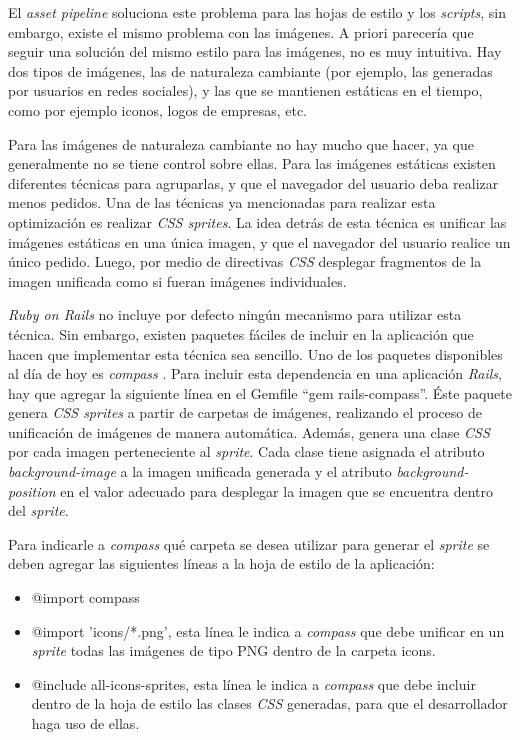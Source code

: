 El \emph{asset pipeline} soluciona este problema para las hojas de estilo y los \emph{scripts}, sin embargo, existe el mismo problema con las imágenes. A priori parecería que seguir
una solución del mismo estilo para las imágenes, no es muy intuitiva. Hay dos tipos de imágenes, las de naturaleza cambiante (por ejemplo, las generadas por usuarios en redes
sociales), y las que se mantienen estáticas en el tiempo, como por ejemplo iconos, logos de empresas, etc. 

Para las imágenes de naturaleza cambiante no hay mucho que hacer, ya
que generalmente no se tiene control sobre ellas. Para las imágenes estáticas existen diferentes técnicas para agruparlas, y que el navegador del usuario deba realizar menos
pedidos. Una de las técnicas ya mencionadas para realizar esta optimización es realizar \emph{CSS sprites}. La idea detrás de esta técnica es unificar las imágenes estáticas en una
única imagen, y que el navegador del usuario realice un único pedido. Luego, por medio de directivas \emph{CSS} desplegar fragmentos de la imagen unificada como si fueran
imágenes individuales.

\emph{Ruby on Rails} no incluye por defecto ningún mecanismo para utilizar esta técnica. Sin embargo, existen paquetes fáciles de incluir en la aplicación que hacen que implementar esta
técnica sea sencillo. Uno de los paquetes disponibles al día de hoy es \emph{compass} \cite{compass}. Para incluir esta dependencia en una aplicación
\emph{Rails}, hay que agregar la siguiente línea en el Gemfile ``gem rails-compass''. Éste paquete genera \emph{CSS sprites} a partir de carpetas de imágenes, realizando el proceso de
unificación de imágenes de manera automática. Además, genera una clase \emph{CSS} por cada imagen perteneciente al \emph{sprite}. Cada clase tiene asignada el atributo
\emph{background-image} a la imagen unificada generada y el atributo \emph{background-position} en el valor adecuado para desplegar la imagen que se encuentra dentro del \emph{sprite}.

Para indicarle a \emph{compass} qué carpeta se desea utilizar para generar el \emph{sprite} se deben agregar las siguientes líneas a la hoja de estilo de la aplicación:
\begin{itemize}

\item @import compass

\item @import 'icons/*.png', esta línea le indica a \emph{compass} que debe unificar en un \emph{sprite} todas las imágenes de tipo PNG dentro de la carpeta icons.

\item @include all-icons-sprites, esta línea le indica a \emph{compass} que debe incluir dentro de la hoja de estilo las clases \emph{CSS} generadas, para que el desarrollador haga uso de
ellas.
\end{itemize}

